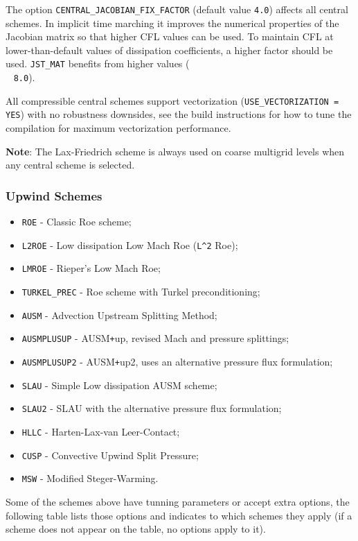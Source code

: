 \documentclass{article}
\begin{document}
The option \verb|CENTRAL_JACOBIAN_FIX_FACTOR| (default value \verb|4.0|) affects all central schemes. In implicit time marching it improves the numerical properties of the Jacobian matrix so that higher CFL values can be used. To maintain CFL at lower-than-default values of dissipation coefficients, a higher factor should be used. \verb|JST_MAT| benefits from higher values (\\~ \verb|8.0|).

All compressible central schemes support vectorization (\verb|USE_VECTORIZATION = YES|) with no robustness downsides, see the build instructions for how to tune the compilation for maximum vectorization performance.

\textbf{Note}: The Lax-Friedrich scheme is always used on coarse multigrid levels when any central scheme is selected.

\subsubsection{Upwind Schemes}

\begin{itemize}
    \item \verb|ROE| - Classic Roe scheme;
    \item \verb|L2ROE| - Low dissipation Low Mach Roe (\verb|L^2| Roe);
    \item \verb|LMROE| - Rieper’s Low Mach Roe;
    \item \verb|TURKEL_PREC| - Roe scheme with Turkel preconditioning;
    \item \verb|AUSM| - Advection Upstream Splitting Method;
    \item \verb|AUSMPLUSUP| - AUSM\verb|+|up, revised Mach and pressure splittings;
    \item \verb|AUSMPLUSUP2| - AUSM\verb|+|up2, uses an alternative pressure flux formulation;
    \item \verb|SLAU| - Simple Low dissipation AUSM scheme;
    \item \verb|SLAU2| - SLAU with the alternative pressure flux formulation;
    \item \verb|HLLC| - Harten-Lax-van Leer-Contact;
    \item \verb|CUSP| - Convective Upwind Split Pressure;
    \item \verb|MSW| - Modified Steger-Warming.
\end{itemize}


Some of the schemes above have tunning parameters or accept extra options, the following table lists those options and indicates to which schemes they apply (if a scheme does not appear on the table, no options apply to it).
\end{document}
